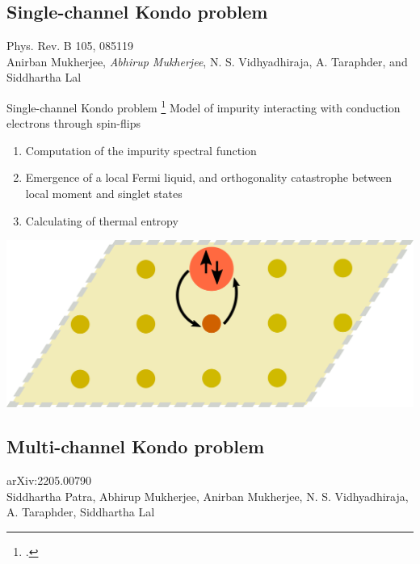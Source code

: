 \documentclass[11pt,aspectratio=169]{beamer}
\begin{document}
\begin{frame}{}
\section{Single-channel Kondo problem}
\small{Phys. Rev. B 105, 085119\\[10pt]
Anirban Mukherjee, {\it Abhirup Mukherjee}, N. S. Vidhyadhiraja, A. Taraphder, and Siddhartha Lal}
\end{frame}

\begin{frame}{Single-channel Kondo problem}
\footcite{kondo1964resistance,wilson1975,andreiKondoreview,hewson1993,nozieres1974fermi,anderson1970,tsvelickKondoreview,affleck1993exact,Goldhaber-Gordon1998,Borzenets2020,sakai_osamu_shimizu,costi_hewson_1990,nozaki2012,affleck1995conformal}
Model of impurity interacting with conduction electrons through spin-flips\\[20pt]

\begin{minipage}{0.59\textwidth}
\begin{enumerate}
\item Computation of the impurity spectral function\\[20pt]
\item Emergence of a local Fermi liquid, and orthogonality catastrophe between local moment and singlet states\\[20pt]
\item Calculating of thermal entropy\\[20pt]
\end{enumerate}
\end{minipage}
\begin{minipage}{0.4\textwidth}
	\includegraphics[width=\textwidth]{kondo-effect.pdf}
\end{minipage}

\end{frame}

\begin{frame}{}
\section{Multi-channel Kondo problem}
\small{arXiv:2205.00790\\[10pt]
Siddhartha Patra, Abhirup Mukherjee, Anirban Mukherjee, N. S. Vidhyadhiraja, A. Taraphder, Siddhartha Lal}
\end{frame}
\end{document}
